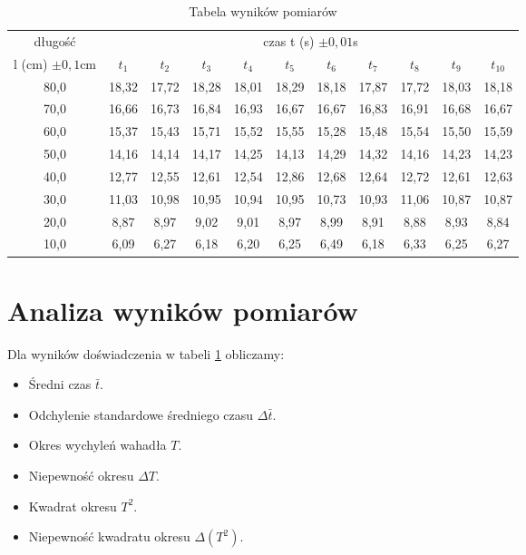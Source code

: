 \documentclass[a4paper,12pt]{article}
\begin{document}
\begin{table}
		\centering
		\Large
		\begin{tabular}{|c|c|c|c|c|c|c|c|c|c|c|}
				\hline
	długość             &\multicolumn{10}{c|}{czas t (s) $\pm 0,01$s} \\ \cline{2-11}
	l (cm) $\pm 0,1$cm	& $t_1$ & $t_2$ & $t_3$ & $t_4$ & $t_5$ & $t_6$ & $t_7$ & $t_8$ & $t_9$ & $t_{10}$\\ \hline
		  80,0  & 18,32 & 17,72 & 18,28 & 18,01 & 18,29 & 18,18 & 17,87 & 17,72 & 18,03 & 18,18\\
		  70,0  & 16,66 & 16,73 & 16,84 & 16,93 & 16,67 & 16,67 & 16,83 & 16,91 & 16,68 & 16,67\\
		  60,0  & 15,37 & 15,43 & 15,71 & 15,52 & 15,55 & 15,28 & 15,48 & 15,54 & 15,50 & 15,59\\
		  50,0  & 14,16 & 14,14 & 14,17 & 14,25 & 14,13 & 14,29 & 14,32 & 14,16 & 14,23 & 14,23\\
		  40,0  & 12,77 & 12,55 & 12,61 & 12,54 & 12,86 & 12,68 & 12,64 & 12,72 & 12,61 & 12,63\\
		  30,0  & 11,03 & 10,98 & 10,95 & 10,94 & 10,95 & 10,73 & 10,93 & 11,06 & 10,87 & 10,87\\
		  20,0  & 8,87 & 8,97 & 9,02 & 9,01 & 8,97 & 8,99 & 8,91 & 8,88 & 8,93 & 8,84\\
		  10,0  & 6,09 & 6,27 & 6,18 & 6,20 & 6,25 & 6,49 & 6,18 & 6,33 & 6,25 & 6,27\\\hline
\end{tabular}
		\caption{Tabela wyników pomiarów}
		\label{tab:pomiar}
\end{table}

\section{Analiza wyników pomiarów}

Dla wyników doświadczenia w tabeli \ref{tab:pomiar} obliczamy:
\begin{itemize}
		\item Średni czas $\bar{t}$.
		\item Odchylenie standardowe średniego czasu $\Delta \bar{t}$.
		\item Okres wychyleń wahadła $T$.
		\item Niepewność okresu $\Delta T$.
		\item Kwadrat okresu $T^2$.
		\item Niepewność kwadratu okresu $\Delta \left( T^2 \right)$.

\end{itemize}
\end{document}
